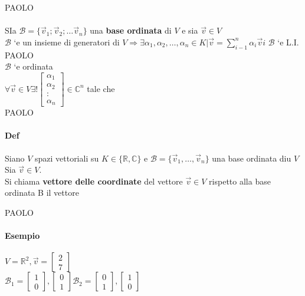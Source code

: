 PAOLO\\\\
SIa $\mathcal{B}=\{\vec{v}_1;\vec{v}_2;\dots\vec{v}_n\}$ una \textbf{base ordinata} di $V$ e sia $\vec{v}\in V$\\
$\mathcal{B}$ `e un insieme di generatori di $V\Longrightarrow \exists\alpha_1,\alpha_2,\dots,\alpha_n\in K\Big|\vec{v}
=\sum_{i-1}^{n}\alpha_i\vec{v}i$
$\mathcal{B}$ `e L.I. \\
PAOLO\\
$\mathcal{B}$ `e ordinata \\
\large{
    $\forall \vec{v}\in V \exists!
    \begin{bmatrix}
        \alpha_1\\
        \alpha_2\\
        :\\
        \alpha_n
    \end{bmatrix}
    \in\mathbb{C}^n $
}
tale che \\
PAOLO\\

\paragraph{Def}
Siano $V$ spazi vettoriali su $K \in\{\mathbb{R}, \mathbb{C}\}$ e $\mathcal{B}=\{\vec{v}_1, \dots, \vec{v}_n\}$ una base ordinata diu $V$\\
Sia $\vec{v}\in V$.\\
Si chiama \textbf{vettore delle coordinate} del vettore $\vec{v}\in V$ rispetto alla base ordinata B il vettore 

PAOLO 

\paragraph{Esempio} $V=\mathbb{R}^2, \vec{v}= 
\begin{bmatrix}
    2\\7
\end{bmatrix}$\\
$\mathcal{B}_1=
\begin{bmatrix}
    1\\0
\end{bmatrix}
,
\begin{bmatrix}
    0\\1
\end{bmatrix}
\mathcal{B}_2=
\begin{bmatrix}
    0\\1
\end{bmatrix}
,
\begin{bmatrix}
    1\\0
\end{bmatrix}
$\\

